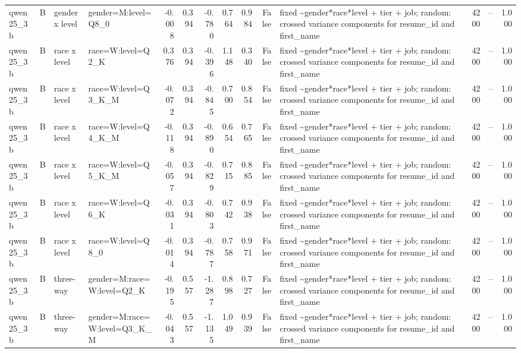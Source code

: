 \begin{tabular}{llllrrrrrrlrlr}
qwen25\_3b & B & gender x level & gender=M:level=Q8\_0 & -0.008 & 0.394 & -0.780 & 0.764 & 0.984 & False & fixed \textasciitilde \space gender*race*level + tier + job; random: crossed variance components for resume\_id and first\_name & 4200 & -- & 1.000 \\
qwen25\_3b & B & race x level & race=W:level=Q2\_K & 0.376 & 0.394 & -0.396 & 1.148 & 0.340 & False & fixed \textasciitilde \space gender*race*level + tier + job; random: crossed variance components for resume\_id and first\_name & 4200 & -- & 1.000 \\
qwen25\_3b & B & race x level & race=W:level=Q3\_K\_M & -0.072 & 0.394 & -0.845 & 0.700 & 0.854 & False & fixed \textasciitilde \space gender*race*level + tier + job; random: crossed variance components for resume\_id and first\_name & 4200 & -- & 1.000 \\
qwen25\_3b & B & race x level & race=W:level=Q4\_K\_M & -0.118 & 0.394 & -0.890 & 0.654 & 0.765 & False & fixed \textasciitilde \space gender*race*level + tier + job; random: crossed variance components for resume\_id and first\_name & 4200 & -- & 1.000 \\
qwen25\_3b & B & race x level & race=W:level=Q5\_K\_M & -0.057 & 0.394 & -0.829 & 0.715 & 0.885 & False & fixed \textasciitilde \space gender*race*level + tier + job; random: crossed variance components for resume\_id and first\_name & 4200 & -- & 1.000 \\
qwen25\_3b & B & race x level & race=W:level=Q6\_K & -0.031 & 0.394 & -0.803 & 0.742 & 0.938 & False & fixed \textasciitilde \space gender*race*level + tier + job; random: crossed variance components for resume\_id and first\_name & 4200 & -- & 1.000 \\
qwen25\_3b & B & race x level & race=W:level=Q8\_0 & -0.014 & 0.394 & -0.787 & 0.758 & 0.971 & False & fixed \textasciitilde \space gender*race*level + tier + job; random: crossed variance components for resume\_id and first\_name & 4200 & -- & 1.000 \\
qwen25\_3b & B & three-way & gender=M:race=W:level=Q2\_K & -0.195 & 0.557 & -1.287 & 0.898 & 0.727 & False & fixed \textasciitilde \space gender*race*level + tier + job; random: crossed variance components for resume\_id and first\_name & 4200 & -- & 1.000 \\
qwen25\_3b & B & three-way & gender=M:race=W:level=Q3\_K\_M & -0.043 & 0.557 & -1.135 & 1.049 & 0.939 & False & fixed \textasciitilde \space gender*race*level + tier + job; random: crossed variance components for resume\_id and first\_name & 4200 & -- & 1.000 \\

\end{tabular}
